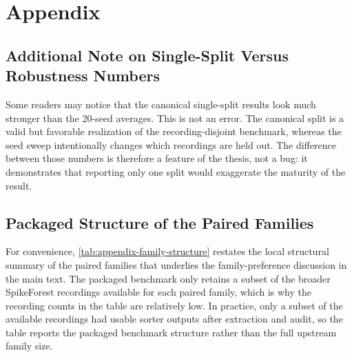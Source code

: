 \chapter{Appendix}
\label{chap:appendix}

\section{Additional Note on Single-Split Versus Robustness Numbers}

Some readers may notice that the canonical single-split \fmiss{} results look much stronger than the 20-seed averages. This is not an error. The canonical split is a valid but favorable realization of the recording-disjoint benchmark, whereas the seed sweep intentionally changes which recordings are held out. The difference between those numbers is therefore a feature of the thesis, not a bug: it demonstrates that reporting only one split would exaggerate the maturity of the \fmiss{} result.

\section{Packaged Structure of the Paired Families}

For convenience, \cref{tab:appendix-family-structure} restates the local structural summary of the paired families that underlies the family-preference discussion in the main text. The packaged benchmark only retains a subset of the broader SpikeForest recordings available for each paired family, which is why the recording counts in the table are relatively low. In practice, only a subset of the available recordings had usable sorter outputs after extraction and audit, so the table reports the packaged benchmark structure rather than the full upstream family size.

